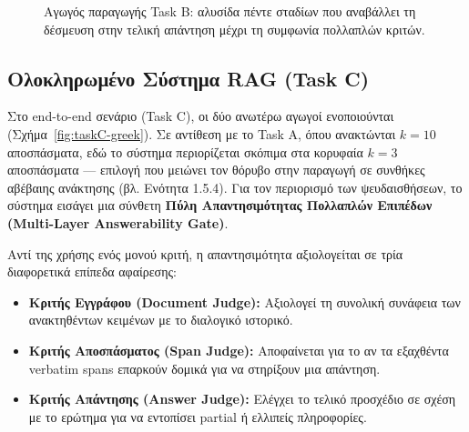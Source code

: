 \begin{figure}[h]
\centering
{}
\caption{Αγωγός παραγωγής Task B: αλυσίδα πέντε σταδίων που αναβάλλει τη δέσμευση στην τελική απάντηση μέχρι τη συμφωνία πολλαπλών κριτών.}
\label{fig:taskB-greek}
\end{figure}

\subsection{Ολοκληρωμένο Σύστημα RAG (Task C)}

Στο end-to-end σενάριο (Task C), οι δύο ανωτέρω αγωγοί ενοποιούνται (Σχήμα~\ref{fig:taskC-greek}). Σε αντίθεση με το Task A, όπου ανακτώνται $k=10$ αποσπάσματα, εδώ το σύστημα περιορίζεται σκόπιμα στα κορυφαία $k=3$ αποσπάσματα — επιλογή που μειώνει τον θόρυβο στην παραγωγή σε συνθήκες αβέβαιης ανάκτησης (βλ. Ενότητα 1.5.4). Για τον περιορισμό των ψευδαισθήσεων, το σύστημα εισάγει μια σύνθετη \textbf{Πύλη Απαντησιμότητας Πολλαπλών Επιπέδων (Multi-Layer Answerability Gate)}.

Αντί της χρήσης ενός μονού κριτή, η απαντησιμότητα αξιολογείται σε τρία διαφορετικά επίπεδα αφαίρεσης:
\begin{itemize}
    \item \textbf{Κριτής Εγγράφου (Document Judge):} Αξιολογεί τη συνολική συνάφεια των ανακτηθέντων κειμένων με το διαλογικό ιστορικό.
    \item \textbf{Κριτής Αποσπάσματος (Span Judge):} Αποφαίνεται για το αν τα εξαχθέντα verbatim spans επαρκούν δομικά για να στηρίξουν μια απάντηση.
    \item \textbf{Κριτής Απάντησης (Answer Judge):} Ελέγχει το τελικό προσχέδιο σε σχέση με το ερώτημα για να εντοπίσει partial ή ελλιπείς πληροφορίες.
\end{itemize}

